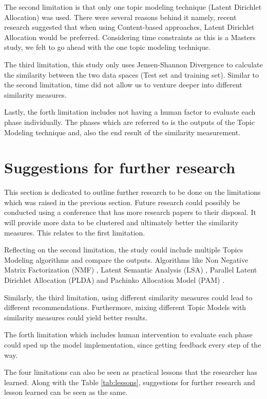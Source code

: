The second limitation is that only one topic modeling technique (Latent Dirichlet Allocation) was used. There were several reasons behind it namely, recent research suggested that when using Content-based approaches, Latent Dirichlet Allocation would be preferred. 
Considering time constraints as this is a Masters study, we felt to go ahead with the one topic modeling technique.

The third limitation, this study only uses Jensen-Shannon Divergence to calculate the similarity between the two data spaces (Test set and training set). Similar to the second limitation, time did not allow us to venture deeper into different similarity measures.

Lastly, the forth limitation includes not having a human factor to evaluate each phase individually. The phases which are referred to is the outputs of the Topic Modeling technique and, also the end result of the similarity measurement. 

\section{Suggestions for further research}
This section is dedicated to outline further research to be done on the limitations which was raised in the previous section. Future research could possibly be conducted using a conference that has more research papers to their disposal. It will provide more data to be clustered and ultimately better the similarity measures. This relates to the first limitation.

Reflecting on the second limitation, the study could include multiple Topics Modeling algorithms and compare the outputs. Algorithms like Non Negative Matrix Factorization (NMF) \cite{Purpura2018}, Latent Semantic Analysis (LSA) \cite{Qomariyah2019}, Parallel Latent Dirichlet Allocation (PLDA) \cite{Mukherjee2019} and Pachinko Allocation Model (PAM) \cite{Koltcov2021}. 

Similarly, the third limitation, using different similarity measures could lead to different recommendations. Furthermore, mixing different Topic Models with similarity measures could yield better results.

The forth limitation which includes human intervention to evaluate each phase could sped up the model implementation, since getting feedback every step of the way.

The four limitations can also be seen as practical lessons that the researcher has learned. Along with the Table \ref{tab:lessons}, suggestions for further research and lesson learned can be seen as the same.


